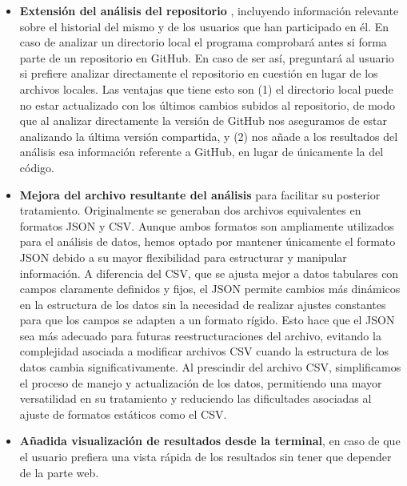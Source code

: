 \documentclass[a4paper, 12pt]{book}
\begin{document}
\begin{itemize}
    \item \textbf{Extensión del análisis del repositorio }, incluyendo información relevante sobre el historial del mismo y de los usuarios que han participado en él. En caso de analizar un directorio local el programa comprobará antes si forma parte de un repositorio en GitHub. En caso de ser así, preguntará al usuario si prefiere analizar directamente el repositorio en cuestión en lugar de los archivos locales. Las ventajas que tiene esto son (1) el directorio local puede no estar actualizado con los últimos cambios subidos al repositorio, de modo que al analizar directamente la versión de GitHub nos aseguramos de estar analizando la última versión compartida, y (2) nos añade a los resultados del análisis esa información referente a GitHub, en lugar de únicamente la del código.

    \item \textbf{Mejora del archivo resultante del análisis} para facilitar su posterior tratamiento. Originalmente se generaban dos archivos equivalentes en formatos JSON y CSV. Aunque ambos formatos son ampliamente utilizados para el análisis de datos, hemos optado por mantener únicamente el formato JSON debido a su mayor flexibilidad para estructurar y manipular información. A diferencia del CSV, que se ajusta mejor a datos tabulares con campos claramente definidos y fijos, el JSON permite cambios más dinámicos en la estructura de los datos sin la necesidad de realizar ajustes constantes para que los campos se adapten a un formato rígido. Esto hace que el JSON sea más adecuado para futuras reestructuraciones del archivo, evitando la complejidad asociada a modificar archivos CSV cuando la estructura de los datos cambia significativamente. Al prescindir del archivo CSV, simplificamos el proceso de manejo y actualización de los datos, permitiendo una mayor versatilidad en su tratamiento y reduciendo las dificultades asociadas al ajuste de formatos estáticos como el CSV.

    \item \textbf{Añadida visualización de resultados desde la terminal}, en caso de que el usuario prefiera una vista rápida de los resultados sin tener que depender de la parte web. 
\end{itemize}

\clearpage
\end{document}
